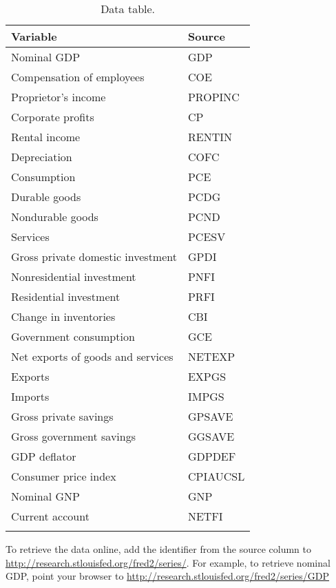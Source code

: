 \begin{table}[H]
\centering
\caption{Data table.}
\begin{tabular*}{0.95\textwidth}{l@{\extracolsep{\fill}}l}
\toprule
Variable & Source\\
\midrule
Nominal GDP                        &GDP \\
Compensation of employees        &COE\\
Proprietor's income                &PROPINC\\
Corporate profits                &CP\\
Rental income                    &RENTIN\\
Depreciation                    &COFC\\
Consumption                     &PCE\\
Durable goods                     &PCDG\\
Nondurable goods                &PCND\\
Services                        &PCESV\\
Gross private domestic investment    &GPDI\\
Nonresidential investment         &PNFI\\
Residential investment            &PRFI\\
Change in inventories            &CBI\\
Government consumption            &GCE\\
Net exports of goods and services    &NETEXP\\
Exports                            &EXPGS\\
Imports                            &IMPGS\\
Gross private savings            &GPSAVE\\
Gross government savings        &GGSAVE\\
GDP deflator                    &GDPDEF\\
Consumer price index            &CPIAUCSL\\
Nominal GNP                        &GNP\\
Current account                    &NETFI\\
\bottomrule
\addlinespace
\end{tabular*}
\begin{minipage}{0.95\textwidth}
\footnotesize{To retrieve the data online, add the identifier from the source column to \url{http://research.stlouisfed.org/fred2/series/}.  For example, to retrieve nominal GDP, point your browser to \url{http://research.stlouisfed.org/fred2/series/GDP}}
\end{minipage}
\end{table}
